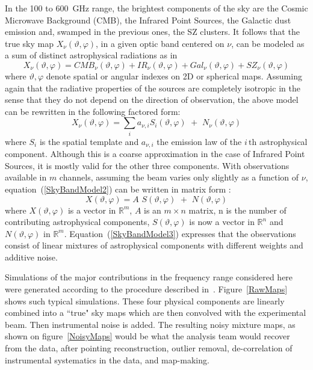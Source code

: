 In the 100 to 600~GHz range, the brightest components of the sky are the Cosmic Microwave Background (CMB), the Infrared Point Sources, 
the Galactic dust emission and, swamped in the previous ones, the SZ clusters. It follows that the true sky map $X_{\nu}(\vartheta, \varphi)$, 
in a given optic band centered on $\nu$, can be modeled as a sum of distinct astrophysical radiations as in
\begin{equation} \label{SkyBandModel1}
	X_{\nu}(\vartheta, \varphi)  =  CMB_{\nu}(\vartheta, \varphi)  + IR_{\nu}(\vartheta, \varphi)  + Gal_{\nu}(\vartheta, \varphi)  + SZ_{\nu}(\vartheta, \varphi) 
\end{equation}
where $\vartheta, \varphi$ denote spatial or angular indexes on 2D or spherical maps. Assuming again that the radiative properties of the sources 
are completely isotropic in the sense that they do not depend on the direction of observation, the above model can be rewritten in the following factored form:
\begin{equation} \label{SkyBandModel2}
X_{\nu}(\vartheta, \varphi) =  \sum_{i} a_{\nu, i} S_{i}(\vartheta, \varphi)  \,\,+\,\, N_{\nu}(\vartheta, \varphi)
\end{equation}
where $S_{i}$ is the spatial template and $a_{\nu, i}$  the emission law of the $i\,{\textrm{th}}$ astrophysical component. Although this is 
a coarse approximation in the case of Infrared Point Sources, it is mostly valid for the other three components. With observations available 
in $m$ channels, assuming the beam varies only slightly as a function of $\nu$, equation~(\ref{SkyBandModel2}) can be written in matrix form : 
\begin{equation} \label{SkyBandModel3}
X(\vartheta, \varphi) = A\,\, S(\vartheta, \varphi)  \,\,+\,\, N(\vartheta, \varphi)
\end{equation}
where $X(\vartheta, \varphi)$ is a vector in $\mathbb{R}^m$, $A$ is an $m\times n$ matrix, n is the number of contributing astrophysical components, 
$S(\vartheta, \varphi)$ is now a vector in  $\mathbb{R}^n$ and $N(\vartheta, \varphi)$ in $\mathbb{R}^m$. Equation~(\ref{SkyBandModel3}) expresses 
that the observations consist of linear mixtures of astrophysical components with different weights and additive noise. 

Simulations of the major contributions in the frequency range considered here were generated according to the procedure described 
in~\cite{cluster:sz_cluster}. Figure~\ref{RawMaps} shows such typical simulations. These four physical components are linearly 
combined into a ``true" sky maps which are then convolved  with the experimental beam. Then instrumental noise is added. The resulting 
noisy mixture maps, as shown on figure~\ref{NoisyMaps} would be what the analysis team would recover from the data, after pointing 
reconstruction, outlier removal, de-correlation of instrumental systematics in the data, and map-making. 

